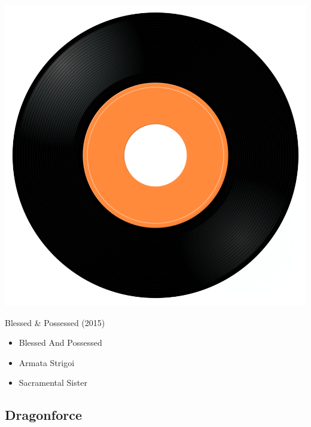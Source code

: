 \begin{minipage}[t]{0.25\textwidth}
\captionsetup{type=figure}
\includegraphics[width=\textwidth]{Images/cover.png}
\caption*{Blessed \& Possessed (2015)}
\end{minipage}
\begin{minipage}[t]{0.25\textwidth}\vspace{0pt}
\begin{itemize}[nosep,leftmargin=1em,labelwidth=*,align=left]
	\setlength{\itemsep}{0pt}
	\item Blessed And Possessed
	\item Armata Strigoi
	\item Sacramental Sister
\end{itemize}
\end{minipage}

\subsection{Dragonforce}

